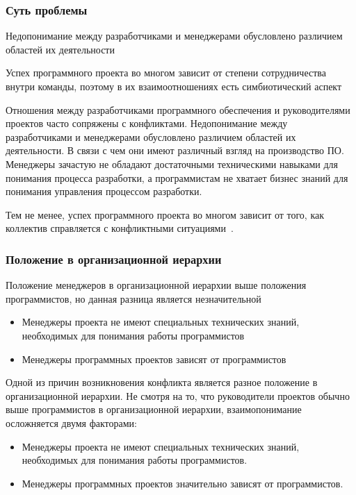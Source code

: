 \documentclass[]{../industrial-development}
\begin{document}
\begin{frame} \frametitle{Суть проблемы} 
\begin{block}{}
Недопонимание между разработчиками и менеджерами обусловлено различием областей их деятельности
\end{block}

Успех программного проекта во многом зависит от степени сотрудничества внутри команды, поэтому в их взаимоотношениях есть симбиотический аспект
\end{frame}

\lecturenotes

Отношения между разработчиками программного обеспечения и руководителями проектов часто сопряжены с конфликтами. Недопонимание между разработчиками и менеджерами обусловлено различием областей их деятельности. В связи с чем они имеют различный взгляд на производство ПО. Менеджеры зачастую не обладают достаточными техническими навыками для понимания процесса разработки, а программистам не хватает бизнес знаний для понимания управления процессом разработки.

Тем не менее, успех программного проекта во многом зависит от того, как коллектив справляется с конфликтными ситуациями~\cite{Awati}. 

\begin{frame} \frametitle{Положение в организационной иерархии} 
Положение менеджеров в организационной иерархии выше положения программистов, но данная разница является незначительной
\begin{itemize}
\item Менеджеры проекта не имеют специальных технических знаний, необходимых для понимания работы программистов
\item Менеджеры программных проектов зависят от программистов
\end{itemize}
\end{frame}

\lecturenotes

Одной из причин возникновения конфликта является разное положение в организационной иерархии. Не смотря на то, что руководители проектов обычно выше программистов в организационной иерархии, взаимопонимание осложняется двумя факторами:
\begin{itemize}
\item Менеджеры проекта не имеют специальных технических знаний, необходимых для понимания работы программистов.
\item Менеджеры программных проектов значительно зависят от программистов. 
\end{itemize}
\end{document}
